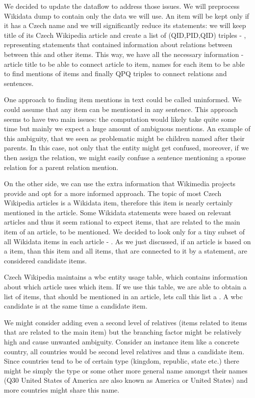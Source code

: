 We decided to update the dataflow to address those issues. We will preprocess Wikidata dump to contain only the data we will use. An item will be kept only if it has a Czech name and we will significantly reduce its statements: we will keep title of its Czech Wikipedia article and create a list of (QID,PID,QID) triples - , representing statements that contained information about relations between between this and other items. This way, we have all the necessary information - article title to be able to connect article to item, names for each item to be able to find mentions of items and finally QPQ triples to connect relations and sentences.

One approach to finding item mentions in text could be called uninformed. We could assume that any item can be mentioned in any sentence. This approach seems to have two main issues: the computation would likely take quite some time but mainly we expect a huge amount of ambiguous mentions. An example of this ambiguity, that we seen as problematic might be children named after their parents. In this case, not only that the entity might get confused, moreover, if we then assign the relation, we might easily confuse a sentence mentioning a spouse relation for a parent relation mention.

On the other side, we can use the extra information that Wikimedia projects provide and opt for a more informed approach. The topic of most Czech Wikipedia articles is a Wikidata item, therefore this item is nearly certainly mentioned in the article. Some Wikidata statements were based on relevant articles and thus it seem rational to expect items, that are related to the main item of an article, to be mentioned. We decided to look only for a tiny subset of all Wikidata items in each article - . As we just discussed, if an article is based on a item, than this item and all items, that are connected to it by a statement, are considered candidate items.

Czech Wikipedia maintains a wbc entity usage table, which contains information about which article uses which item. If we use this table, we are able to obtain a list of items, that should be mentioned in an article, lets call this list a . A wbc candidate is at the same time a candidate item.

We might consider adding even a second level of relatives (items related to items that are related to the main item) but the branching factor might be relatively high and cause unwanted ambiguity. Consider an instance item like a concrete country, all countries would be second level relatives and thus a candidate item. Since countries tend to be of certain type (kingdom, republic, state etc.) there might be simply the type or some other more general name amongst their names (Q30 United States of America are also known as America or United States) and more countries might share this name.

